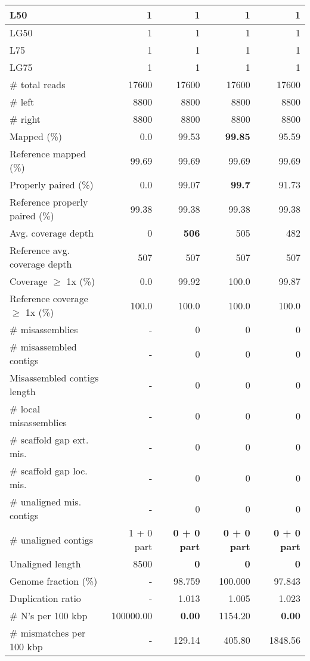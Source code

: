 \documentclass[12pt,a4paper]{article}
\begin{document}
\begin{table}[ht]
\begin{center}
\begin{tabular}{|l*{4}{|r}|}
L50 & 1 & 1 & 1 & 1 \\ \hline
LG50 & 1 & 1 & 1 & 1 \\ \hline
L75 & 1 & 1 & 1 & 1 \\ \hline
LG75 & 1 & 1 & 1 & 1 \\ \hline
\# total reads & 17600 & 17600 & 17600 & 17600 \\ \hline
\# left & 8800 & 8800 & 8800 & 8800 \\ \hline
\# right & 8800 & 8800 & 8800 & 8800 \\ \hline
Mapped (\%) & 0.0 & 99.53 & {\bf 99.85} & 95.59 \\ \hline
Reference mapped (\%) & 99.69 & 99.69 & 99.69 & 99.69 \\ \hline
Properly paired (\%) & 0.0 & 99.07 & {\bf 99.7} & 91.73 \\ \hline
Reference properly paired (\%) & 99.38 & 99.38 & 99.38 & 99.38 \\ \hline
Avg. coverage depth & 0 & {\bf 506} & 505 & 482 \\ \hline
Reference avg. coverage depth & 507 & 507 & 507 & 507 \\ \hline
Coverage $\geq$ 1x (\%) & 0.0 & 99.92 & 100.0 & 99.87 \\ \hline
Reference coverage $\geq$ 1x (\%) & 100.0 & 100.0 & 100.0 & 100.0 \\ \hline
\# misassemblies & - & 0 & 0 & 0 \\ \hline
\# misassembled contigs & - & 0 & 0 & 0 \\ \hline
Misassembled contigs length & - & 0 & 0 & 0 \\ \hline
\# local misassemblies & - & 0 & 0 & 0 \\ \hline
\# scaffold gap ext. mis. & - & 0 & 0 & 0 \\ \hline
\# scaffold gap loc. mis. & - & 0 & 0 & 0 \\ \hline
\# unaligned mis. contigs & - & 0 & 0 & 0 \\ \hline
\# unaligned contigs & 1 + 0 part & {\bf 0 + 0 part} & {\bf 0 + 0 part} & {\bf 0 + 0 part} \\ \hline
Unaligned length & 8500 & {\bf 0} & {\bf 0} & {\bf 0} \\ \hline
Genome fraction (\%) & - & 98.759 & 100.000 & 97.843 \\ \hline
Duplication ratio & - & 1.013 & 1.005 & 1.023 \\ \hline
\# N's per 100 kbp & 100000.00 & {\bf 0.00} & 1154.20 & {\bf 0.00} \\ \hline
\# mismatches per 100 kbp & - & 129.14 & 405.80 & 1848.56 \\ \hline

\end{tabular}
\end{center}
\end{table}
\end{document}
